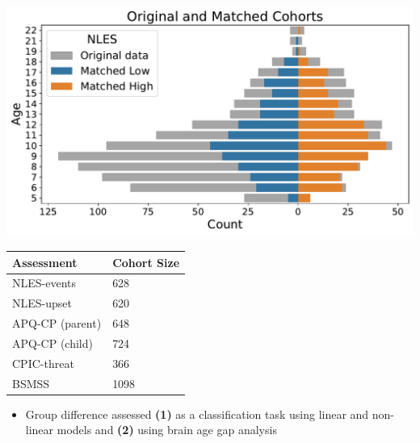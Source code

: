 \documentclass[a0paper,landscape,fontscale=0.385]{baposter}
\newenvironment{Figure}
  {\par\medskip\noindent\minipage{\linewidth}}
  {\endminipage\par\medskip}
\begin{document}
\begin{poster}
{\begin{minipage}[b]{0.68\textwidth}
    \begin{Figure}
        \centering
        \includegraphics[width=\linewidth]{matching.pdf}
    \end{Figure}
\end{minipage}
\hfill
\begin{minipage}[b]{0.29\textwidth}
    \begin{tabular}{|p{2.1cm} p{0.95cm}|} 
        \hline
        Assessment & Cohort Size \\
        \hline\hline
        NLES-events & 628 \\
        NLES-upset & 620 \\
        APQ-CP \newline (parent) & 648 \\
        APQ-CP (child) & 724 \\
        CPIC-threat & 366 \\
        BSMSS & 1098 \\
        \hline
    \end{tabular}
    \vspace{2.7em}
\end{minipage}

\begin{itemize}[nosep, leftmargin=*]
    \item Group difference assessed \textbf{(1)} as a classification task using
    linear and non-linear models and \textbf{(2)} using brain age gap analysis
\end{itemize}

}
\end{poster}
\end{document}
